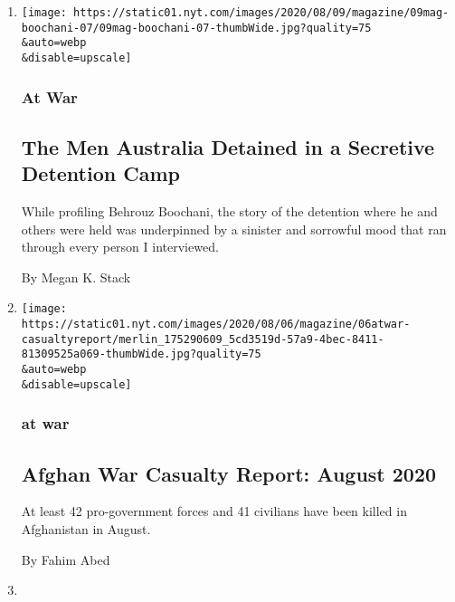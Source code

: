 \begin{enumerate}
\def\labelenumi{\arabic{enumi}.}
\item
  \href{/2020/08/07/magazine/manus-island-detainees-behrouz-boochani.html}{}

  \texttt{[image: https://static01.nyt.com/images/2020/08/09/magazine/09mag-boochani-07/09mag-boochani-07-thumbWide.jpg?quality=75\\\&auto=webp\\\&disable=upscale]}

  \hypertarget{at-war}{%
  \subsubsection{At War}\label{at-war}}

  \hypertarget{the-men-australia-detained-in-a-secretive-detention-camp}{%
  \subsection{The Men Australia Detained in a Secretive Detention
  Camp}\label{the-men-australia-detained-in-a-secretive-detention-camp}}

  While profiling Behrouz Boochani, the story of the detention where he
  and others were held was underpinned by a sinister and sorrowful mood
  that ran through every person I interviewed.

  By Megan K. Stack
\item
  \href{/2020/08/06/magazine/afghan-war-casualty-report-august-2020.html}{}

  \texttt{[image: https://static01.nyt.com/images/2020/08/06/magazine/06atwar-casualtyreport/merlin\_175290609\_5cd3519d-57a9-4bec-8411-81309525a069-thumbWide.jpg?quality=75\\\&auto=webp\\\&disable=upscale]}

  \hypertarget{at-war-1}{%
  \subsubsection{at war}\label{at-war-1}}

  \hypertarget{afghan-war-casualty-report-august-2020}{%
  \subsection{Afghan War Casualty Report: August
  2020}\label{afghan-war-casualty-report-august-2020}}

  At least 42 pro-government forces and 41 civilians have been killed in
  Afghanistan in August.

  By Fahim Abed
\item
  \href{/2020/08/06/magazine/poem-i-want-to-speak-of-unity.html}{}


\end{enumerate}
